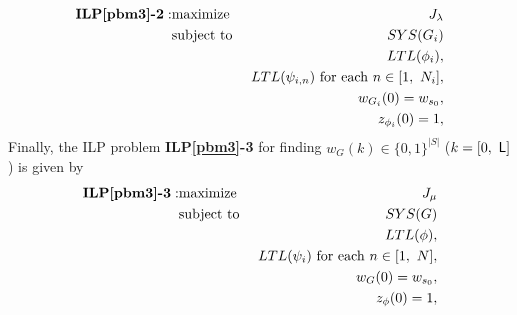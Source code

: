 \documentclass[journal,twoside,web]{IEEEtran}
\newcommand{\req}[1]{\eqref{#1}}
\newcommand{\Len}{{\sf L}}
\newcommand{\M}{\mathcal{M}}
\newcommand{\W}{\mathcal{W}}
\begin{document}
\begin{eqnarray}
\mbox{\bf ILP\ref{pbm3}-2}: &\mbox{maximize }&J_\lambda \notag \\
&\mbox{subject to }&SYS(G_i) \notag \\
&& LTL(\phi_i),\notag \\
&& LTL(\psi_{i,n}) \  {\rm{for\ each\ }}  n \in [1,\ N_i], \notag\\
&& w_{G_i}(0)=w_{s_0}, \notag \\
&&z_{\phi_i} (0) = 1, \notag
\end{eqnarray}
%
Finally, the ILP problem {\bf ILP\ref{pbm3}-3} for finding $w_G(k)\in\{0,1\}^{|S|}$ ($k=[0,~\Len]$) is given by
%
\begin{eqnarray}
\mbox{\bf ILP\ref{pbm3}-3}: &\mbox{maximize }&J_\mu \notag \\
&\mbox{subject to }&SYS(G) \notag \\
&& LTL(\phi),\notag \\
&& LTL(\psi_i) \  {\rm{for\ each\ }}  n \in [1,\ N], \notag\\
&& w_G(0)=w_{s_0}, \notag \\
&&z_{\phi} (0) = 1, \notag
\end{eqnarray}

\begin{comment}

\begin{eqnarray}
&\mbox{max: }&J_\kappa \notag \\
&\mbox{subject to: }&\req{w}-\req{ckj},\ \textit{ILP}(\phi),\ \textit{ILP}(\psi_i),\notag\\
&&z_{\phi} (0) = 1, {\rm{for\ each\ }}  i \in [1,\ N],\notag\\ &&\tilde{\phi}_{i,{j_i},\kappa}(0)=1.\notag
\end{eqnarray}
%
\begin{eqnarray}
&\mbox{max: }&
J_{\lambda,\M,\W}\notag\\
&\mbox{subject to: }&\req{w}-\req{ckj},\ \textit{ILP}(\phi_i),\ \textit{ILP}(\psi^i_n),\notag\\
&&z_{\phi_i} (0) = 1, {\rm{for\ each\ }}  n \in [1,\ N_i],\notag\\&&\req{hier1}-\req{hier3},~ z^{i,{j_i}}_{\phi_\kappa}(0)=1 .\notag
\end{eqnarray}
\begin{eqnarray}
&\mbox{max: }&
J_{\mu,\M,\W}\notag \\
&\mbox{subject to: }&\req{w}-\req{ckj},\ \textit{ILP}(\phi),\ \textit{ILP}(\psi_n),\notag\\
&&z_{\phi} (0) = 1, {\rm{for\ each\ }}  n \in [1,\ N],\notag\\&&\req{hier2-1}-\req{hier2-4},~ z^{i}_{\phi_\lambda}(0)=1.\notag
\end{eqnarray}


\end{comment}
\end{document}
